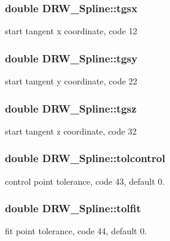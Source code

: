 \subsubsection[{tgsx}]{\setlength{\rightskip}{0pt plus 5cm}double D\+R\+W\+\_\+\+Spline\+::tgsx}\label{class_d_r_w___spline_af669678833d9334001f372ef3e459063}
start tangent x coordinate, code 12 \hypertarget{class_d_r_w___spline_a0d22ecfcfa1ccdf83d3799555b808fb6}{}
\subsubsection[{tgsy}]{\setlength{\rightskip}{0pt plus 5cm}double D\+R\+W\+\_\+\+Spline\+::tgsy}\label{class_d_r_w___spline_a0d22ecfcfa1ccdf83d3799555b808fb6}
start tangent y coordinate, code 22 \hypertarget{class_d_r_w___spline_a432ab2ee17f00fe8c3537f3ab12f0524}{}
\subsubsection[{tgsz}]{\setlength{\rightskip}{0pt plus 5cm}double D\+R\+W\+\_\+\+Spline\+::tgsz}\label{class_d_r_w___spline_a432ab2ee17f00fe8c3537f3ab12f0524}
start tangent z coordinate, code 32 \hypertarget{class_d_r_w___spline_a9ebcea64002b14f0adfae66eadd9f24a}{}
\subsubsection[{tolcontrol}]{\setlength{\rightskip}{0pt plus 5cm}double D\+R\+W\+\_\+\+Spline\+::tolcontrol}\label{class_d_r_w___spline_a9ebcea64002b14f0adfae66eadd9f24a}
control point tolerance, code 43, default 0. \hypertarget{class_d_r_w___spline_a8f91c72942350988a2c3b4652162d613}{}
\subsubsection[{tolfit}]{\setlength{\rightskip}{0pt plus 5cm}double D\+R\+W\+\_\+\+Spline\+::tolfit}\label{class_d_r_w___spline_a8f91c72942350988a2c3b4652162d613}
fit point tolerance, code 44, default 0. \hypertarget{class_d_r_w___spline_a62139497f4127ed0d909cbe6cb7d5304}{}
